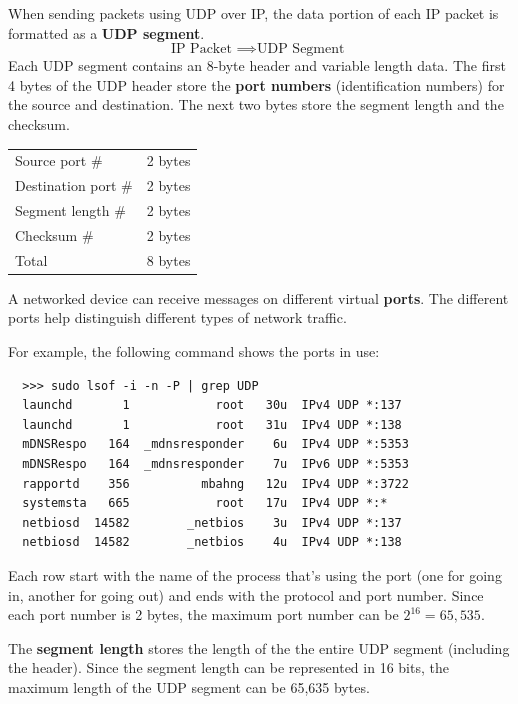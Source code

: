 \documentclass{article}
\newcounter{definition}[section]
\newcounter{example}[section]
\begin{document}
  When sending packets using UDP over IP, the data portion of each IP packet is formatted as a \textbf{UDP segment}. 
  \begin{equation}
    \text{IP Packet } \implies \text{UDP Segment }
  \end{equation}
  Each UDP segment contains an 8-byte header and variable length data. The first 4 bytes of the UDP header store the \textbf{port numbers} (identification numbers) for the source and destination. The next two bytes store the segment length and the checksum. 
  \begin{center}
  \begin{tabular}{l|l}
      Source port \# & 2 bytes \\
      Destination port \# & 2 bytes \\
      Segment length \# & 2 bytes \\
      Checksum \# & 2 bytes \\
      \hline 
      Total & 8 bytes
  \end{tabular}
  \end{center}

  \begin{definition}[Ports]
    \label{def:ports}
  A networked device can receive messages on different virtual \textbf{ports}. The different ports help distinguish different types of network traffic. 
  \end{definition}

  For example, the following command shows the ports in use: 
  \begin{lstlisting}
  >>> sudo lsof -i -n -P | grep UDP
  launchd       1            root   30u  IPv4 UDP *:137
  launchd       1            root   31u  IPv4 UDP *:138
  mDNSRespo   164  _mdnsresponder    6u  IPv4 UDP *:5353
  mDNSRespo   164  _mdnsresponder    7u  IPv6 UDP *:5353
  rapportd    356          mbahng   12u  IPv4 UDP *:3722
  systemsta   665            root   17u  IPv4 UDP *:*
  netbiosd  14582        _netbios    3u  IPv4 UDP *:137
  netbiosd  14582        _netbios    4u  IPv4 UDP *:138
  \end{lstlisting}
  Each row start with the name of the process that's using the port (one for going in, another for going out) and ends with the protocol and port number. Since each port number is 2 bytes, the maximum port number can be $2^{16} = 65,535$. 

  The \textbf{segment length} stores the length of the the entire UDP segment (including the header). Since the segment length can be represented in 16 bits, the maximum length of the UDP segment can be 65,635 bytes. 
\end{document}
